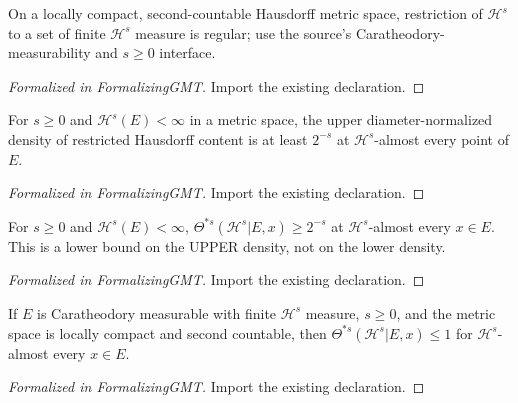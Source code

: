 \begin{theorem}
\label{gmt:hausdorff-regular}
\leanok
{}
On a locally compact, second-countable Hausdorff metric space, restriction of $\mathcal H^s$ to a set of finite $\mathcal H^s$ measure is regular; use the source's Caratheodory-measurability and $s\geq0$ interface.
\end{theorem}
\begin{proof}[Formalized in FormalizingGMT]
\leanok
{}
Import the existing declaration.
\end{proof}

\begin{theorem}
\label{gmt:content-density}
\leanok
{}
For $s\geq0$ and $\mathcal H^s(E)<\infty$ in a metric space, the upper diameter-normalized density of restricted Hausdorff content is at least $2^{-s}$ at $\mathcal H^s$-almost every point of $E$.
\end{theorem}
\begin{proof}[Formalized in FormalizingGMT]
\leanok
{}
Import the existing declaration.
\end{proof}

\begin{theorem}
\label{gmt:hausdorff-density-lower}
\leanok
{}
For $s\geq0$ and $\mathcal H^s(E)<\infty$, $\Theta^{*s}(\mathcal H^s|E,x)\geq2^{-s}$ at $\mathcal H^s$-almost every $x\in E$. This is a lower bound on the UPPER density, not on the lower density.
\end{theorem}
\begin{proof}[Formalized in FormalizingGMT]
\leanok
{}
Import the existing declaration.
\end{proof}

\begin{theorem}
\label{gmt:hausdorff-density-upper}
\leanok
{}
If $E$ is Caratheodory measurable with finite $\mathcal H^s$ measure, $s\geq0$, and the metric space is locally compact and second countable, then $\Theta^{*s}(\mathcal H^s|E,x)\leq1$ for $\mathcal H^s$-almost every $x\in E$.
\end{theorem}
\begin{proof}[Formalized in FormalizingGMT]
\leanok
{}
Import the existing declaration.
\end{proof}


